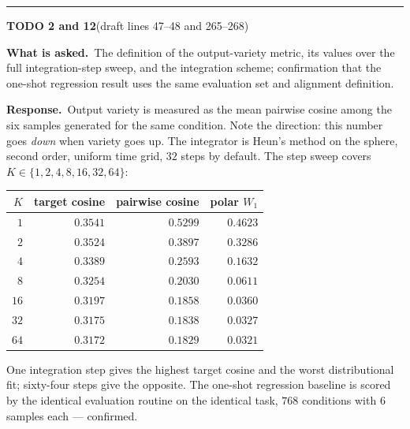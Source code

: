 \documentclass[11pt]{article}
\newenvironment{todoitem}[2]{%
  \par\medskip\noindent\rule{\textwidth}{0.7pt}\par\nobreak\smallskip
  \noindent\textbf{\large TODO #1}\quad\textnormal{\small(draft #2)}\par\nobreak\smallskip
}{\par\medskip}
\newcommand{\ask}[1]{\noindent\textbf{What is asked.}\ #1\par\smallskip}
\newcommand{\resp}[1]{\noindent\textbf{Response.}\ #1\par}
\begin{document}
\begin{todoitem}{2 and 12}{lines 47--48 and 265--268}
\ask{The definition of the output-variety metric, its values over the full integration-step
sweep, and the integration scheme; confirmation that the one-shot regression result uses the same
evaluation set and alignment definition.}

\resp{Output variety is measured as the mean pairwise cosine among the six samples generated for
the same condition. Note the direction: this number goes \emph{down} when variety goes up. The
integrator is Heun's method on the sphere, second order, uniform time grid, $32$ steps by
default. The step sweep covers $K\in\{1,2,4,8,16,32,64\}$:

\begin{center}
\small
\begin{tabular}{@{}rrrr@{}}
\toprule
$K$ & target cosine & pairwise cosine & polar $W_1$\\
\midrule
$1$  & $0.3541$ & $0.5299$ & $0.4623$\\
$2$  & $0.3524$ & $0.3897$ & $0.3286$\\
$4$  & $0.3389$ & $0.2593$ & $0.1632$\\
$8$  & $0.3254$ & $0.2030$ & $0.0611$\\
$16$ & $0.3197$ & $0.1858$ & $0.0360$\\
$32$ & $0.3175$ & $0.1838$ & $0.0327$\\
$64$ & $0.3172$ & $0.1829$ & $0.0321$\\
\bottomrule
\end{tabular}
\end{center}

One integration step gives the highest target cosine and the worst distributional fit; sixty-four
steps give the opposite. The one-shot regression baseline is scored by the identical evaluation
routine on the identical task, $768$ conditions with $6$ samples each --- confirmed.}
\end{todoitem}
\end{document}
